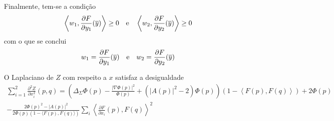 \begin{demonstracao}
	Finalmente, tem-se a condição 
	\begin{equation*}
		\left\langle w_1, \frac{\partial F}{\partial y_1}(\overline{y}) \right\rangle \geq 0 \quad \text{e} \quad \left\langle w_2, \frac{\partial F}{\partial y_2}(\overline{y}) \right\rangle \geq 0
	\end{equation*}	
	com o que se conclui
	\begin{equation*}
	w_1 = \frac{\partial F}{\partial y_1}(\overline{y}) \quad \text{e} \quad w_2 = \frac{\partial F}{\partial y_2}(\overline{y})
	\end{equation*}
\end{demonstracao}




\begin{proposicao}
	O Laplaciano de $Z$ com respeito a $x$ satisfaz a desigualdade
	\begin{multline}\label{2_diff_Z_x}
		\sum_{i=1}^{2} \frac{\partial^2 Z}{\partial x_i^2} (p,q) = \left( \Delta_{\Sigma} \Phi(p) - \frac{| \nabla \Phi(p) |^2}{\Phi(p)} + (|A(p)|^2 - 2) \Phi(p) \right) (1 - \left\langle F(p), F(q) \right\rangle) + 2 \Phi(p)\\
		 - \frac{2 \Phi(p)^2 - |A(p)|^2}{2 \Phi(p) (1 - \langle F(p), F(q) \rangle)} \sum_i \left\langle \frac{\partial F}{\partial x_i}(p), F(q) \right\rangle^2
	\end{multline}
\end{proposicao}

